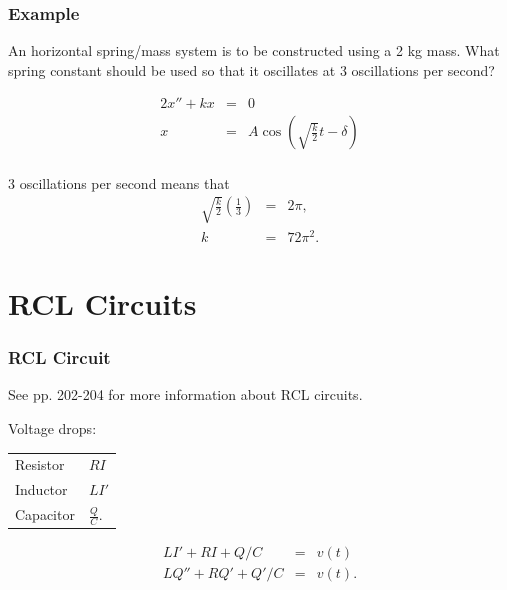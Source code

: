 \documentclass{beamer}
\newcommand{\lp}{\left(}
\newcommand{\rp}{\right)}
\begin{document}
\begin{frame}
  \frametitle{Example}

  An horizontal spring/mass system is to be constructed using a 2 kg
  mass. What spring constant should be used so that it oscillates at 3
  oscillations per second?

  \begin{eqnarray*}
    2 x'' + kx & = & 0 \\
    x & = & A \cos\lp \sqrt{\frac{k}{2}} t - \delta \rp \\
  \end{eqnarray*}

  {
    3 oscillations per second means that
    \begin{eqnarray*}
      \sqrt{\frac{k}{2}} \lp \frac{1}{3} \rp & = & 2 \pi, \\
      k & = & 72 \pi^2.
    \end{eqnarray*}
  }

\end{frame}

\section{RCL Circuits}

\begin{frame}
  \frametitle{RCL Circuit}

  See pp. 202-204 for more information about RCL circuits.

  Voltage drops: \\
  \begin{tabular}{l@{~$=$~}l}
    Resistor & $RI$ \\
    Inductor & $LI'$ \\
    Capacitor & $\frac{Q}{C}$.
  \end{tabular}

  \begin{eqnarray*}
    L I' + RI + Q/C & = & v(t) \\
    L Q'' + RQ' + Q'/C & = & v(t).
  \end{eqnarray*}

\end{frame}
\end{document}
